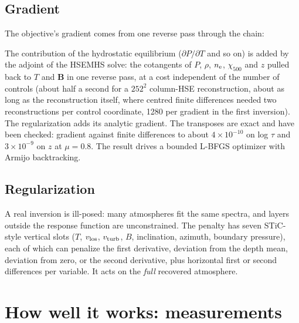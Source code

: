 \subsection{Gradient}
The objective's gradient comes from one reverse pass through the chain:
\begin{center}
\end{center}
The contribution of the hydrostatic equilibrium ($\partial P/\partial T$ and so on) is added by the adjoint of the HSEMHS solve: the cotangents of $P$, $\rho$, $n_{\rm e}$, $\chi_{500}$ and $z$ pulled back to $T$ and $\mathbf B$ in one reverse pass, at a cost independent of the number of controls (about half a second for a $252^2$ column-HSE reconstruction, about as long as the reconstruction itself, where centred finite differences needed two reconstructions per control coordinate, 1280 per gradient in the first inversion). The regularization adds its analytic gradient. The transposes are exact and have been checked: gradient against finite differences to about $4\times10^{-10}$ on log $\tau$ and $3\times10^{-9}$ on $z$ at $\mu=0.8$. The result drives a bounded L-BFGS optimizer with Armijo backtracking.

\subsection{Regularization}
A real inversion is ill-posed: many atmospheres fit the same spectra, and layers outside the response function are unconstrained. The penalty has seven STiC-style vertical slots ($T$, $v_{\rm los}$, $v_{\rm turb}$, $B$, inclination, azimuth, boundary pressure), each of which can penalize the first derivative, deviation from the depth mean, deviation from zero, or the second derivative, plus horizontal first or second differences per variable. It acts on the \emph{full} recovered atmosphere.

\section{How well it works: measurements}\label{sec:validation}

